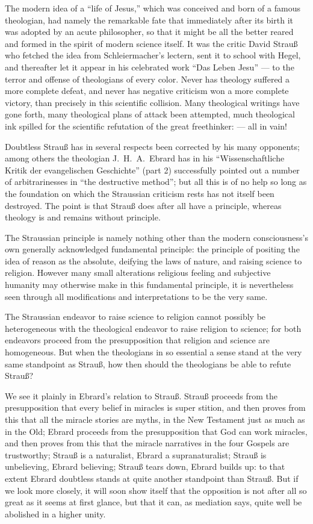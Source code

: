 \documentclass[12pt,a4paper]{book}
\begin{document}
The modern idea of a ``life of Jesus,'' which was conceived and born of a famous
theologian, had namely the remarkable fate that immediately after its birth it was adopted
by an acute philosopher, so that it might be all the better reared and formed in the
spirit of modern science itself. It was the critic David Strauß who fetched the idea from
Schleiermacher's lectern, sent it
to school with Hegel, and thereafter let it appear in his celebrated work ``Das Leben
Jesu'' --- to the terror and offense of theologians of every color. Never has theology
suffered a more complete defeat, and never has negative criticism won a more complete
victory, than precisely in this scientific collision. Many theological writings have gone
forth, many theological plans of attack been attempted, much theological ink spilled for
the scientific refutation of the great freethinker: --- all in vain!

Doubtless Strauß has in several respects been corrected by his many opponents; among
others the theologian J.\ H.\ A.\ Ebrard has in his ``Wissenschaftliche Kritik der
evangelischen Geschichte'' (part 2) successfully pointed out a number of arbitrarinesses
in ``the destructive method''; but all this is of no help so long as the foundation on
which the Straussian criticism rests has not itself been destroyed. The point is that
Strauß does after all have a principle, whereas theology is and remains without principle.

The Straussian principle is namely nothing other than the modern consciousness's own
generally acknowledged fundamental principle: the principle of positing the idea of reason
as the absolute, deifying the laws of nature, and raising science to religion. However
many small alterations religious feeling and subjective humanity may otherwise make in
this fundamental principle, it is nevertheless seen through all modifications and
interpretations to be the very same.

The Straussian endeavor to raise science to religion cannot possibly be heterogeneous with
the theological endeavor to raise religion to science; for both endeavors proceed from the
presupposition that religion and science are homogeneous. But when the theologians in so
essential a sense stand at the very same standpoint as Strauß, how then should the
theologians be able to refute Strauß?

We see it plainly in Ebrard's relation to Strauß. Strauß proceeds from the presupposition
that every belief in miracles is super%
stition, and then proves from this that all the miracle stories are myths, in the New
Testament just as much as in the Old; Ebrard proceeds from the presupposition that God can
work miracles, and then proves from this that the miracle narratives in the four Gospels
are trustworthy; Strauß is a naturalist, Ebrard a supranaturalist; Strauß is unbelieving,
Ebrard believing; Strauß tears down, Ebrard builds up: to that extent Ebrard doubtless
stands at quite another standpoint than Strauß. But if we look more closely, it will soon
show itself that the opposition is not after all so great as it seems at first glance, but
that it can, as mediation says, quite well be abolished in a higher unity.
\end{document}
